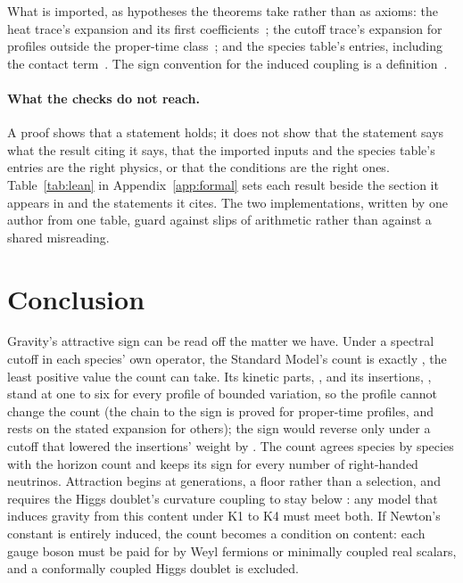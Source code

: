 \documentclass[aps,prd,reprint,amsmath,amssymb,superscriptaddress,nofootinbib]{revtex4-2}
\begin{document}
What is imported, as hypotheses the theorems take rather than as axioms: the heat
trace's expansion and its first coefficients~\cite{Vassilevich2003}; the cutoff
trace's expansion for profiles outside the proper-time class~\cite{vanSuijlekom2024,
EcksteinIochum2018,EstradaGraciaBondiaVarilly1998}; and the species table's entries,
including the contact term~\cite{Kabat1995}. The sign convention for the induced
coupling is a definition~\cite{FrolovFursaevZelnikov1997}.

\paragraph{What the checks do not reach.} A proof shows that a statement holds; it
does not show that the statement says what the result citing it says, that the
imported inputs and the species table's entries are the right physics, or that the
conditions are the right ones. Table~\ref{tab:lean} in Appendix~\ref{app:formal} sets
each result beside the section it appears in and the statements it cites. The two
implementations, written by one
author from one table, guard against slips of arithmetic rather than against a shared
misreading.

\section{Conclusion}
\label{sec:conclusion}

Gravity's attractive sign can be read off the matter we have. Under a spectral cutoff
in each species' own operator, the Standard Model's count is exactly \smNet{}, the
least positive value the count can take. Its kinetic parts, \smKinetic, and its
insertions, \smInsertion, stand at one to six for every profile of bounded variation,
so the profile cannot change the count (the chain to the sign is proved for
proper-time profiles, and rests on the stated expansion for others); the sign would
reverse only under a cutoff that lowered the insertions' weight by \smMarginPct. The
count agrees species by species with the horizon count and keeps its sign for every
number of right-handed neutrinos. Attraction begins at \floorGenerationsSpelled{}
generations, a floor rather than a selection, and requires the Higgs doublet's
curvature coupling to stay below \smCouplingBound{}: any model that induces gravity
from this content under K1 to K4 must meet both. If Newton's constant is entirely
induced, the count becomes a condition on content: each gauge boson must be paid for by
\matterPerBosonSpelled{} Weyl fermions or minimally coupled real scalars, and a
conformally coupled Higgs doublet is excluded.
\end{document}
